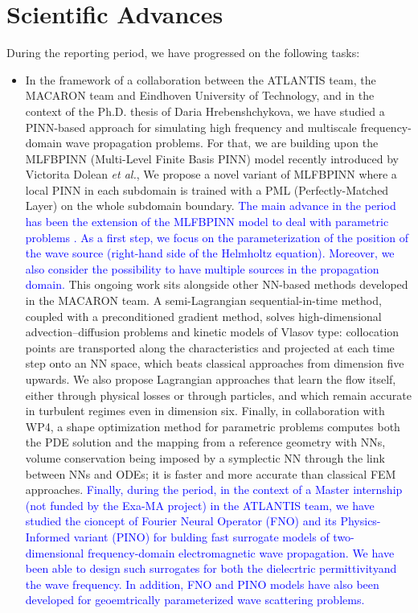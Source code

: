 \section{Scientific Advances}



During the reporting period, we have progressed on the following tasks:

\begin{itemize}
\item[T2.1] In the  framework of a collaboration  between the ATLANTIS
  team, the MACARON  team and Eindhoven University  of Technology, and
  in the  context of  the Ph.D.  thesis  of Daria  Hrebenshchykova, we
  have studied a PINN-based approach for simulating high frequency and
  multiscale frequency-domain wave propagation  problems. For that, we
  are building upon the MLFBPINN (Multi-Level Finite Basis PINN) model
  recently introduced by  Victorita Dolean {\em et al.},  We propose a
  novel variant  of MLFBPINN where a  local PINN in each  subdomain is
  trained with a PML (Perfectly-Matched  Layer) on the whole subdomain
  boundary. \textcolor{blue}{The  main advance in the  period has been
    the  extension  of the  MLFBPINN  model  to deal  with  parametric
    problems .  As  a first step, we focus on  the parameterization of
    the position of the wave  source (right-hand side of the Helmholtz
    equation).   Moreover, we  also consider  the possibility  to have
    multiple sources  in the  propagation domain.}  This  ongoing work
  sits alongside other NN-based methods developed in the MACARON team.
  A   semi-Lagrangian  sequential-in-time   method,  coupled   with  a
  preconditioned    gradient     method,    solves    high-dimensional
  advection–diffusion  problems and  kinetic  models  of Vlasov  type:
  collocation  points are  transported along  the characteristics  and
  projected at each time step onto  an NN space, which beats classical
  approaches from  dimension five upwards. We  also propose Lagrangian
  approaches  that  learn the  flow  itself,  either through  physical
  losses or through particles, and  which remain accurate in turbulent
  regimes even in dimension six. Finally, in collaboration with WP4, a
  shape optimization method for  parametric problems computes both the
  PDE solution  and the  mapping from a  reference geometry  with NNs,
  volume conservation  being imposed  by a  symplectic NN  through the
  link  between NNs  and ODEs;  it is  faster and  more accurate  than
  classical  FEM  approaches.   \textcolor{blue}{Finally,  during  the
    period, in the  context of a Master internship (not  funded by the
    Exa-MA project) in the ATLANTIS team, we have studied the cioncept
    of Fourier Neural Operator  (FNO) and its Physics-Informed variant
    (PINO)  for  bulding  fast  surrogate  models  of  two-dimensional
    frequency-domain electromagnetic  wave propagation.  We  have been
    able  to   design  such   surrogates  for  both   the  dielecrtric
    permittivityand  the wave  frequency.  In  addition, FNO  and PINO
    models have  also been  developed for  geoemtrically parameterized
    wave scattering problems.}


\end{itemize}
